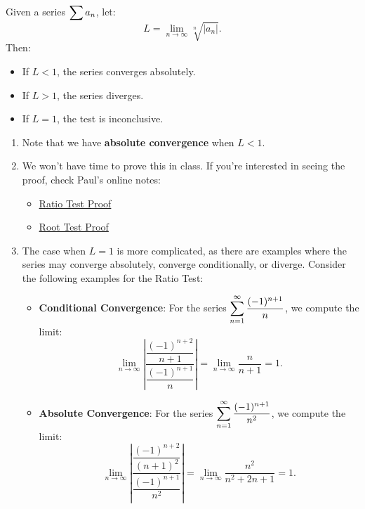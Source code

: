 \begin{thm}
    Given a series $\displaystyle\sum a_n$, let:
    \[L = \lim_{n \to \infty} \sqrt[n]{|a_n|}.\]
    Then:
    \begin{itemize}
        \item If $L < 1$, the series converges absolutely.
        \item If $L > 1$, the series diverges.
        \item If $L = 1$, the test is inconclusive.
    \end{itemize}
\end{thm}

\begin{rmk}
    \begin{enumerate}
        \item Note that we have \textbf{absolute convergence} when $L<1$. 

        \item We won't have time to prove this in class. If you're interested in seeing the proof, check Paul's online notes:
        \begin{itemize}
            \item \href{https://tutorial.math.lamar.edu/Classes/CalcII/RatioTest.aspx#Series_Ratio_Proof}{Ratio Test Proof}
            \item \href{https://tutorial.math.lamar.edu/classes/calcii/roottest.aspx#Series_Root_Proof}{Root Test Proof}
        \end{itemize}
        
        \item The case when $L = 1$ is more complicated, as there are examples where the series may converge absolutely, converge conditionally, or diverge. Consider the following examples for the Ratio Test:
        \begin{itemize}
            \item \textbf{Conditional Convergence}: For the series $\displaystyle\sum_{n=1}^\infty \dfrac{(-1)^{n+1}}{n}$, we compute the limit:
            \[\lim_{n\to \infty} \left| \dfrac{\dfrac{(-1)^{n+2}}{n+1}}{\dfrac{(-1)^{n+1}}{n}} \right| = \lim_{n \to \infty} \dfrac{n}{n+1} = 1.\]
            
            \item \textbf{Absolute Convergence}: For the series $\displaystyle\sum_{n=1}^\infty \dfrac{(-1)^{n+1}}{n^2}$, we compute the limit:
            \[\lim_{n\to \infty} \left| \dfrac{\dfrac{(-1)^{n+2}}{(n+1)^2}}{\dfrac{(-1)^{n+1}}{n^2}} \right| = \lim_{n \to \infty} \dfrac{n^2}{n^2 + 2n + 1} = 1.\]
    

\end{itemize}
\end{enumerate}
\end{rmk}

